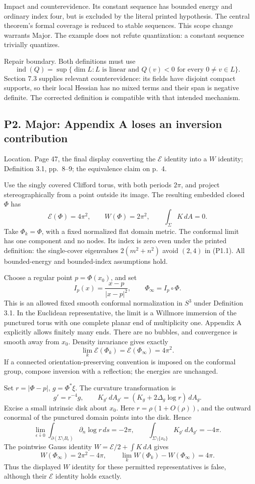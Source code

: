 \documentclass[10pt]{article}
\begin{document}
Impact and counterevidence. Its constant sequence has bounded energy and ordinary index four, but is excluded by the literal printed hypothesis. The central theorem’s formal coverage is reduced to stable sequences. This scope change warrants Major. The example does not refute quantization: a constant sequence trivially quantizes.\par
Repair boundary. Both definitions must use \[\operatorname{ind}(Q)=\sup\{\dim L:L\text{ is linear and }Q(v)<0
                           \text{ for every }0\ne v\in L\}.\] Section 7.3 supplies relevant counterevidence: its fields have disjoint compact supports, so their local Hessian has no mixed terms and their span is negative definite. The corrected definition is compatible with that intended mechanism.\par
\subsection*{P2. Major: Appendix A loses an inversion contribution}
Location. Page 47, the final display converting the \(\mathcal E\) identity into a \(W\) identity; Definition 3.1, pp. 8–9; the equivalence claim on p. 4.\par
Use the singly covered Clifford torus, with both periods \(2\pi\), and project stereographically from a point outside its image. The resulting embedded closed \(\Phi\) has \[\mathcal E(\Phi)=4\pi^2,\qquad W(\Phi)=2\pi^2,\qquad \int_\Sigma K\,dA=0.\] Take \(\Phi_k=\Phi\), with a fixed normalized flat domain metric. The conformal limit has one component and no nodes. Its index is zero even under the printed definition: the single-cover eigenvalues \(2(m^2+n^2)\) avoid \((2,4)\) in (P1.1). All bounded-energy and bounded-index assumptions hold.\par
Choose a regular point \(p=\Phi(x_0)\), and set \[I_p(x)=\frac{x-p}{|x-p|^2},\qquad \Phi_\infty=I_p\circ\Phi .\] This is an allowed fixed smooth conformal normalization in \(S^3\) under Definition 3.1. In the Euclidean representative, the limit is a Willmore immersion of the punctured torus with one complete planar end of multiplicity one. Appendix A explicitly allows finitely many ends. There are no bubbles, and convergence is smooth away from \(x_0\). Density invariance gives exactly \[\lim_k\mathcal E(\Phi_k)=\mathcal E(\Phi_\infty)=4\pi^2.\] If a connected orientation-preserving convention is imposed on the conformal group, compose inversion with a reflection; the energies are unchanged.\par
Set \(r=|\Phi-p|\), \(g=\Phi^*\xi\). The curvature transformation is \[g'=r^{-4}g,\qquad
 K_{g'}\,dA_{g'}=(K_g+2\Delta_g\log r)\,dA_g.\] Excise a small intrinsic disk about \(x_0\). Here \(r=\rho(1+O(\rho))\), and the outward conormal of the punctured domain points into the disk. Hence \[\lim_{\epsilon\downarrow0}
 \int_{\partial(\Sigma\setminus B_\epsilon)}
       \partial_n\log r\,ds=-2\pi,\qquad
 \int_{\Sigma\setminus\{x_0\}}K_{g'}\,dA_{g'}=-4\pi.\] The pointwise Gauss identity \(W=\mathcal E/2+\int K\,dA\) gives \[W(\Phi_\infty)=2\pi^2-4\pi,\qquad
 \lim_kW(\Phi_k)-W(\Phi_\infty)=4\pi .
 \tag{P2.1}\] Thus the displayed \(W\) identity for these permitted representatives is false, although their \(\mathcal E\) identity holds exactly.\par
\end{document}
